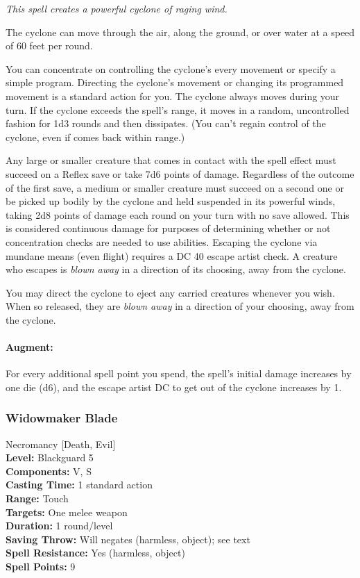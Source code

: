 \emph{This spell creates a powerful cyclone of raging wind.} 

The cyclone can move through the air, along the ground, or over water at a speed of 60 feet per round. 

You can concentrate on controlling the cyclone's every movement or specify a simple program. 
Directing the cyclone's movement or changing its programmed movement is a standard action for you. 
The cyclone always moves during your turn. 
If the cyclone exceeds the spell's range, it moves in a random, uncontrolled fashion for 1d3 rounds and then dissipates. (You can't regain control of the cyclone, even if comes back within range.)

Any large or smaller creature that comes in contact with the spell effect must succeed on a Reflex save or take 7d6 points of damage. 
Regardless of the outcome of the first save, a medium or smaller creature must succeed on a second one or be picked up bodily by the cyclone and held suspended in its powerful winds, taking 2d8 points of damage each round on your turn with no save allowed. This is considered continuous damage for purposes of determining whether or not concentration checks are needed to use abilities. Escaping the cyclone via mundane means (even flight) requires a DC 40 escape artist check. A creature who escapes is \emph{blown away} in a direction of its choosing, away from the cyclone.

You may direct the cyclone to eject any carried creatures whenever you wish. When so released, they are \emph{blown away} in a direction of your choosing, away from the cyclone.

\paragraph{Augment:} For every additional spell point you spend, the spell's initial damage increases by one die (d6), and the escape artist DC to get out of the cyclone increases by 1.
\subsubsection{Widowmaker Blade}
\label{Spell:WidowmakerBlade}
Necromancy [Death, Evil]
\\ \textbf{Level:} Blackguard 5
\\ \textbf{Components:} V, S
\\ \textbf{Casting Time:} 1 standard action
\\ \textbf{Range:} Touch
\\ \textbf{Targets:} One melee weapon
\\ \textbf{Duration:} 1 round/level
\\ \textbf{Saving Throw:} Will negates (harmless, object); see text
\\ \textbf{Spell Resistance:} Yes (harmless, object)
\\ \textbf{Spell Points:} 9

